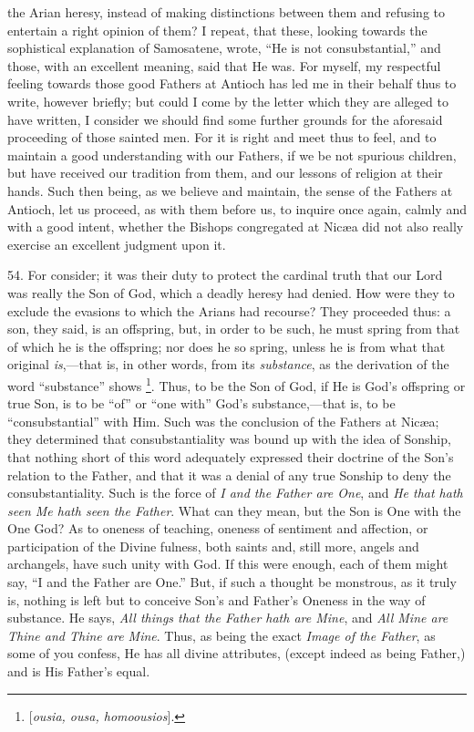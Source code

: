 the Arian heresy, instead of making distinctions between them and
refusing to entertain a right opinion of them? I repeat, that these,
looking towards the sophistical explanation of Samosatene, wrote, ``He
is not consubstantial,'' and those, with an excellent meaning, said
that He was. For myself, my respectful feeling towards those good
Fathers at Antioch has led me in their behalf thus to write, however
briefly; but could I come by the letter which they are alleged to have
written, I consider we should find some further grounds for the
aforesaid proceeding of those sainted men. For it is right and meet
thus to feel, and to maintain a good understanding with our Fathers,
if we be not spurious children, but have received our tradition from
them, and our lessons of religion at their hands. Such then being, as
we believe and maintain, the sense of the Fathers at Antioch, let us
proceed, as with them before us, to inquire once again, calmly and
with a good intent, whether the Bishops congregated at Nicæa did not
also really exercise an excellent judgment upon it.

54. For consider; it was their
duty to protect the cardinal truth that our Lord was really the Son of
God, which a deadly heresy had denied. How were they to exclude the
evasions to which the Arians had recourse? They proceeded thus: a son,
they said, is an offspring, but, in order to be such, he must spring
from that of which he is the offspring; nor does he so spring, unless
he is from what that original \emph{is},—that is, in other words, from its \emph{substance},
as the derivation of the word ``substance'' shows \footnote{[\emph{ousia, ousa, homoousios}].}. Thus, to be the Son of God, if He is God's offspring or true
Son, is to be ``of'' or ``one with'' God's substance,—that is, to be ``consubstantial''
with Him. Such was the conclusion of the Fathers at Nicæa; they
determined that consubstantiality was bound up with the idea of
Sonship, that nothing short of this word adequately expressed their
doctrine of the Son's relation to the Father, and that it was a denial
of any true Sonship to deny the consubstantiality. Such is the force
of \emph{I and the Father are One}, and \emph{He that hath seen Me hath
seen the Father}. What can they mean, but the Son is One with the
One God? As to oneness of teaching, oneness of sentiment and
affection, or participation of the Divine fulness, both saints and,
still more, angels and archangels, have such unity with God. If this
were enough, each of them might say, ``I and the Father are One.'' But,
if such a thought be monstrous, as it truly is, nothing is left but to
conceive Son's and Father's Oneness in the way of substance. He says, \emph{All
things that the Father hath are Mine}, and \emph{All Mine are Thine
and Thine are Mine}. Thus, as being the exact \emph{Image of the
Father}, as some of you confess, He has all divine attributes,
(except indeed as being Father,) and is His Father's equal.

